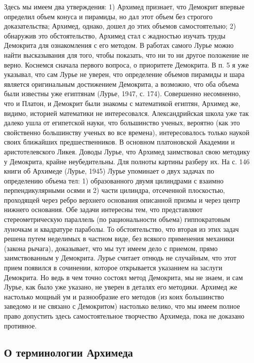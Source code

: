 Здесь мы имеем два утверждения: 1) Архимед признает, что Демокрит
впервые определил объем конуса и пирамиды, но дал этот объем без
строгого доказательства; Архимед, однако, дошел до этих объемов
самостоятельно; 2) обнаружив это обстоятельство, Архимед стал с
жадностью изучать труды Демокрита для ознакомления с его методом. В
работах самого Лурье можно найти высказывания для того, чтобы
показать, что ни то ни другое положение не верно. Коснемся сначала
первого вопроса, о приоритете Демокрита. В п. 5 я уже указывал, что
сам Лурье не уверен, что определение объемов пирамиды и шара является
оригинальным достижением Демокрита, а возможно, что оба объема были
известны уже египтянам (Лурье, 1947, с. 174). Совершенно несомненно,
что и Платон, и Демокрит были знакомы с математикой египтян, Архимед
же, видимо, историей математики не интересовался. Александрийская
школа уже так далеко ушла от египетской науки, что большинство ученых,
вероятно (как это свойственно большинству ученых во все времена),
интересовалось только наукой своих ближайших предшественников. В
основном платоновской Академии и аристотелевского Ликея. Доводы Лурье,
что Архимед заимствовал свою методику у Демокрита, крайне
неубедительны. Для полноты картины разберу их. На с. 146 книги об
Архимеде (Лурье, 1945) Лурье упоминает о двух задачах по определению
объема тел: 1) образованного двумя цилиндрами с взаимно
перпендикулярными осями и 2) части цилиндра, отсеченной плоскостью,
проходящей через ребро верхнего основания описанной призмы и через
центр нижнего основания. Обе задачи интересны тем, что представляют
стереометрическую параллель (по рациональности объема) гиппократовым
луночкам и квадратуре параболы. То обстоятельство, что вторая из этих
задач решена путем неделимых в частном виде, без всякого применения
механики (закона рычага), доказывает, что мы тут имеем дело с приемом,
прямо заимствованным у Демокрита. Лурье считает отнюдь не случайным,
что этот прием появился в сочинении, которое открывается указанием на
заслуги Демокрита. Но ведь в чем точно состоял метод Демокрита, мы не
знаем, и сам Лурье, как было уже указано, не уверен в деталях его
методики. Архимед же настолько мощный ум и разнообразие его методов
(из коих большинство заведомо и не связано с Демокритом) настолько
велико, что мы имеем полное право допустить здесь самостоятельное
творчество Архимеда, пока не доказано противное.

\subsection{О терминологии Архимеда}

